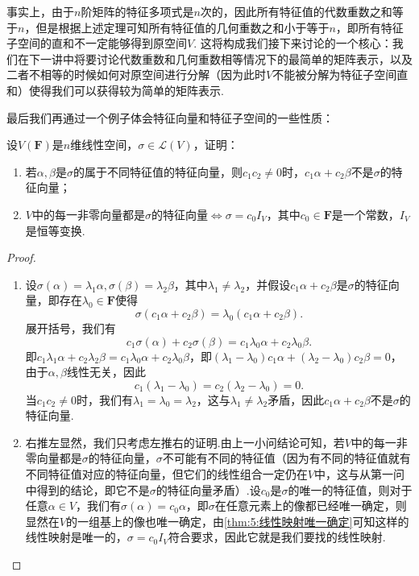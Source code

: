 事实上，由于$n$阶矩阵的特征多项式是$n$次的，因此所有特征值的代数重数之和等于$n$，但是根据上述定理可知所有特征值的几何重数之和小于等于$n$，即所有特征子空间的直和不一定能够得到原空间$V$. 这将构成我们接下来讨论的一个核心：我们在下一讲中将要讨论代数重数和几何重数相等情况下的最简单的矩阵表示，以及二者不相等的时候如何对原空间进行分解（因为此时$V$不能被分解为特征子空间直和）使得我们可以获得较为简单的矩阵表示.

最后我们再通过一个例子体会特征向量和特征子空间的一些性质：
\begin{example}
    设$V(\mathbf{F})$是$n$维线性空间，$\sigma\in \mathcal{L}(V)$，证明：
          \begin{enumerate}
              \item 若$\alpha,\beta$是$\sigma$的属于不同特征值的特征向量，则$c_1c_2\neq 0$时，$c_1\alpha+c_2\beta$不是$\sigma$的特征向量；

              \item $V$中的每一非零向量都是$\sigma$的特征向量$\iff\sigma=c_0I_V$，其中$c_0\in\mathbf{F}$是一个常数，$I_V$是恒等变换.
          \end{enumerate}
\end{example}

\begin{proof}
    \begin{enumerate}
        \item 设$\sigma(\alpha)=\lambda_1\alpha,\sigma(\beta)=\lambda_2\beta$，其中$\lambda_1\neq\lambda_2$，并假设$c_1\alpha+c_2\beta$是$\sigma$的特征向量，即存在$\lambda_0\in\mathbf{F}$使得
        \[\sigma(c_1\alpha+c_2\beta)=\lambda_0(c_1\alpha+c_2\beta).\]
        展开括号，我们有
        \[c_1\sigma(\alpha)+c_2\sigma(\beta)=c_1\lambda_0\alpha+c_2\lambda_0\beta.\]
        即$c_1\lambda_1\alpha+c_2\lambda_2\beta=c_1\lambda_0\alpha+c_2\lambda_0\beta$，即$(\lambda_1-\lambda_0)c_1\alpha+(\lambda_2-\lambda_0)c_2\beta=0$，由于$\alpha,\beta$线性无关，因此
        \[c_1(\lambda_1-\lambda_0)=c_2(\lambda_2-\lambda_0)=0.\]
        当$c_1c_2\neq 0$时，我们有$\lambda_1=\lambda_0=\lambda_2$，这与$\lambda_1\neq\lambda_2$矛盾，因此$c_1\alpha+c_2\beta$不是$\sigma$的特征向量.

        \item 右推左显然，我们只考虑左推右的证明.由上一小问结论可知，若$V$中的每一非零向量都是$\sigma$的特征向量，$\sigma$不可能有不同的特征值（因为有不同的特征值就有不同特征值对应的特征向量，但它们的线性组合一定仍在$V$中，这与从第一问中得到的结论，即它不是$\sigma$的特征向量矛盾）.设$c_0$是$\sigma$的唯一的特征值，则对于任意$\alpha\in V$，我们有$\sigma(\alpha)=c_0\alpha$，即$\sigma$在任意元素上的像都已经唯一确定，则显然在$V$的一组基上的像也唯一确定，由\autoref{thm:5:线性映射唯一确定}可知这样的线性映射是唯一的，$\sigma=c_0I_V$符合要求，因此它就是我们要找的线性映射.
    \end{enumerate}
\end{proof}

